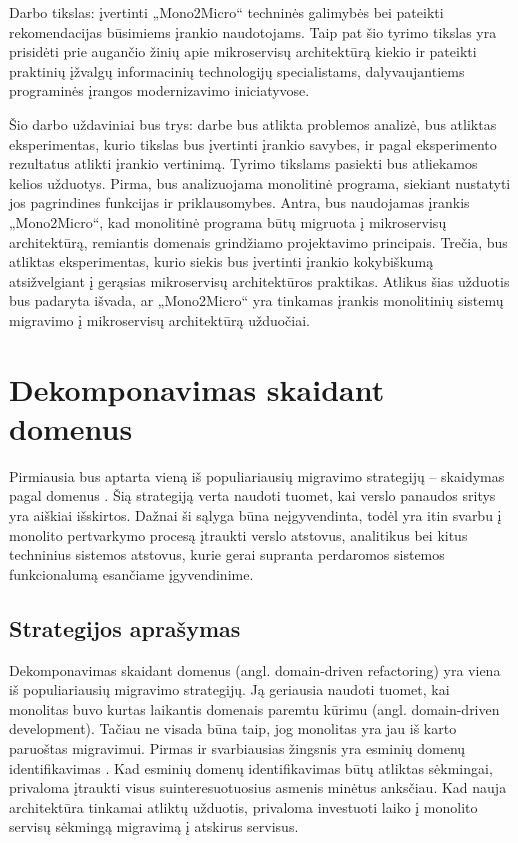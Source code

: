 \documentclass{VUMIFPSbakalaurinis}
\begin{document}
Darbo tikslas: įvertinti „Mono2Micro“ techninės galimybės bei pateikti rekomendacijas būsimiems įrankio naudotojams. Taip pat šio tyrimo tikslas yra prisidėti prie augančio žinių apie mikroservisų architektūrą kiekio ir pateikti praktinių įžvalgų informacinių technologijų specialistams, dalyvaujantiems programinės įrangos modernizavimo iniciatyvose.

Šio darbo uždaviniai bus trys: darbe bus atlikta problemos analizė, bus atliktas eksperimentas, kurio tikslas bus įvertinti įrankio savybes, ir pagal eksperimento rezultatus atlikti įrankio vertinimą. Tyrimo tikslams pasiekti bus atliekamos kelios užduotys. Pirma, bus analizuojama monolitinė programa, siekiant nustatyti jos pagrindines funkcijas ir priklausomybes. Antra, bus naudojamas įrankis „Mono2Micro“, kad monolitinė programa būtų migruota į mikroservisų architektūrą, remiantis domenais grindžiamo projektavimo principais. Trečia, bus atliktas eksperimentas, kurio siekis bus įvertinti įrankio kokybiškumą atsižvelgiant į gerąsias mikroservisų architektūros praktikas. Atlikus šias užduotis bus padaryta išvada, ar „Mono2Micro“ yra tinkamas įrankis monolitinių sistemų migravimo į mikroservisų architektūrą užduočiai.

\section{Dekomponavimas skaidant domenus}
Pirmiausia bus aptarta vieną iš populiariausių migravimo strategijų – skaidymas pagal domenus \cite{Wal22}. Šią strategiją verta naudoti tuomet, kai verslo panaudos sritys yra aiškiai išskirtos. Dažnai  ši sąlyga būna neįgyvendinta, todėl yra itin svarbu į monolito pertvarkymo procesą įtraukti verslo atstovus, analitikus bei kitus techninius sistemos atstovus, kurie gerai supranta perdaromos sistemos funkcionalumą esančiame įgyvendinime.

\subsection{Strategijos aprašymas}
Dekomponavimas skaidant domenus (angl. domain-driven refactoring) yra viena iš populiariausių migravimo strategijų. Ją geriausia naudoti tuomet, kai monolitas buvo kurtas laikantis domenais paremtu kūrimu (angl. domain-driven development). Tačiau ne visada būna taip, jog monolitas yra jau iš karto paruoštas migravimui. Pirmas ir svarbiausias žingsnis yra esminių domenų identifikavimas \cite{LZ22}. Kad esminių domenų identifikavimas būtų atliktas sėkmingai, privaloma įtraukti visus suinteresuotuosius asmenis minėtus anksčiau. Kad nauja architektūra tinkamai atliktų užduotis, privaloma investuoti laiko į monolito servisų sėkmingą migravimą į atskirus servisus. 
\end{document}
